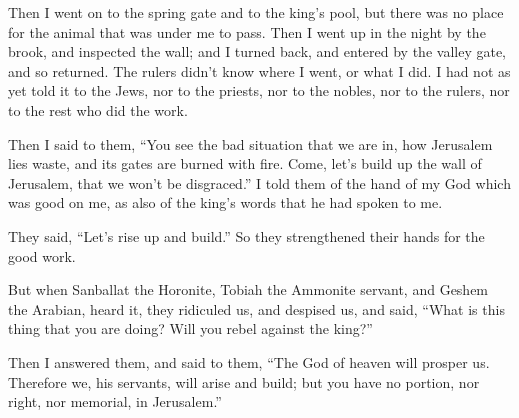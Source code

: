 {Then I went on to the spring gate and to the king’s pool, but there was no place for the animal that was under me to pass.
Then I went up in the night by the brook, and inspected the wall; and I turned back, and entered by the valley gate, and so returned.
The rulers didn’t know where I went, or what I did. I had not as yet told it to the Jews, nor to the priests, nor to the nobles, nor to the rulers, nor to the rest who did the work.
\par }{\PP {}Then I said to them, “You see the bad situation that we are in, how Jerusalem lies waste, and its gates are burned with fire. Come, let’s build up the wall of Jerusalem, that we won’t be disgraced.”
I told them of the hand of my God which was good on me, as also of the king’s words that he had spoken to me.
\par }{\PP They said, “Let’s rise up and build.” So they strengthened their hands for the good work.
\par }{\PP {}But when Sanballat the Horonite, Tobiah the Ammonite servant, and Geshem the Arabian, heard it, they ridiculed us, and despised us, and said, “What is this thing that you are doing? Will you rebel against the king?”
\par }{\PP {}Then I answered them, and said to them, “The God of heaven will prosper us. Therefore we, his servants, will arise and build; but you have no portion, nor right, nor memorial, in Jerusalem.”

}

